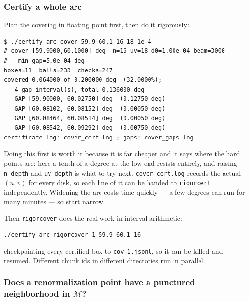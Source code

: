 \documentclass{amsart}
\begin{document}
\subsubsection{Certify a whole arc}

Plan the covering in floating point first, then do it rigorously:
\begin{verbatim}
$ ./certify_arc cover 59.9 60.1 16 18 1e-4
# cover [59.9000,60.1000] deg  n=16 uv=18 d0=1.00e-04 beam=3000
#   min_gap=5.0e-04 deg
boxes=11  balls=233  checks=247
covered 0.064000 of 0.200000 deg  (32.0000%);
   4 gap-interval(s), total 0.136000 deg
   GAP [59.90000, 60.02750] deg  (0.12750 deg)
   GAP [60.08102, 60.08152] deg  (0.00050 deg)
   GAP [60.08464, 60.08514] deg  (0.00050 deg)
   GAP [60.08542, 60.09292] deg  (0.00750 deg)
certificate log: cover_cert.log ; gaps: cover_gaps.log
\end{verbatim}
Doing this first is worth it because it is far cheaper and it says where the hard points are: here
a tenth of a degree at the low end resists entirely, and raising \texttt{n\_depth} and
\texttt{uv\_depth} is what to try next.  \texttt{cover\_cert.log} records the actual $(u,v)$ for
every disk, so each line of it can be handed to \texttt{rigorcert} independently.  Widening the arc
costs time quickly --- a few degrees can run for many minutes --- so start narrow.

Then \texttt{rigorcover} does the real work in interval arithmetic:
\begin{verbatim}
./certify_arc rigorcover 1 59.9 60.1 16
\end{verbatim}
checkpointing every certified box to \texttt{cov\_1.jsonl}, so it can be killed and resumed.
Different chunk ids in different directories run in parallel.

\subsubsection{Does a renormalization point have a punctured neighborhood in $\mathcal{M}$?}
\end{document}
